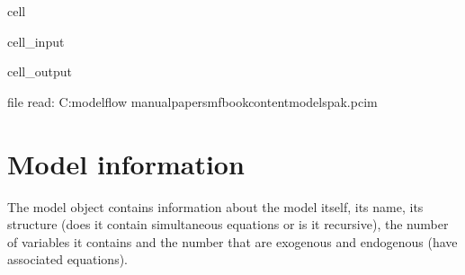 \documentclass[letterpaper,10pt,english]{jupyterBook}
\begin{document}
\begin{sphinxuseclass}{cell}\begin{sphinxVerbatimInput}

\begin{sphinxuseclass}{cell_input}
\begin{sphinxVerbatim}[commandchars=\\\{\}]
   

      

  

\end{sphinxVerbatim}

\end{sphinxuseclass}\end{sphinxVerbatimInput}
\begin{sphinxVerbatimOutput}

\begin{sphinxuseclass}{cell_output}
\begin{sphinxVerbatim}[commandchars=\\\{\}]
file read:  C:\PYGZbs{}modelflow manual\PYGZbs{}papers\PYGZbs{}mfbook\PYGZbs{}content\PYGZbs{}models\PYGZbs{}pak.pcim
\end{sphinxVerbatim}

\end{sphinxuseclass}\end{sphinxVerbatimOutput}

\end{sphinxuseclass}

\section{Model information}
\label{\detokenize{content/06_ModelAnalytics/ModelStructure:model-information}}
\sphinxAtStartPar
The model object contains information about the model itself, its name, its structure (does it contain simultaneous equations or is it recursive), the number of variables it contains and the number that are exogenous and endogenous (have associated equations).
\end{document}
